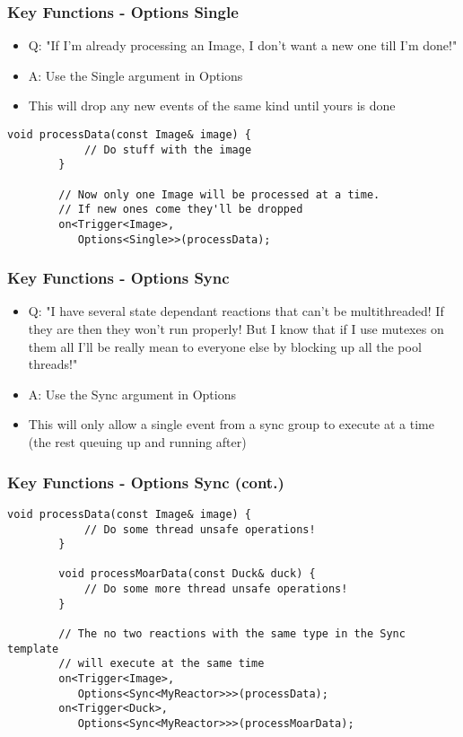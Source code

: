 \documentclass{beamer}
\begin{document}
\begin{frame}[fragile]
	\frametitle {Key Functions - Options Single}
	\begin{itemize}
		\item Q: "If I'm already processing an Image, I don't want a new one till I'm done!"
		\item A: Use the Single argument in Options
		\item This will drop any new events of the same kind until yours is done
	\end{itemize}

	\begin{lstlisting}[language=nuclear]
		void processData(const Image& image) {
		    // Do stuff with the image
		}

		// Now only one Image will be processed at a time.
		// If new ones come they'll be dropped
		on<Trigger<Image>, 
		   Options<Single>>(processData);
	\end{lstlisting}
\end{frame}

\begin{frame}[fragile]
	\frametitle {Key Functions - Options Sync}
	\begin{itemize}
		\item Q: "I have several state dependant reactions that can't be multithreaded! If they are then they won't run properly! But I know that if I use mutexes on them all I'll be really mean to everyone else by blocking up all the pool threads!"
		\item A: Use the Sync argument in Options
		\item This will only allow a single event from a sync group to execute at a time (the rest queuing up and running after)
	\end{itemize}
\end{frame}

\begin{frame}[fragile]
	\frametitle {Key Functions - Options Sync (cont.)}
	\begin{lstlisting}[language=nuclear]
		void processData(const Image& image) {
		    // Do some thread unsafe operations!
		}
		
		void processMoarData(const Duck& duck) {
		    // Do some more thread unsafe operations!
		}

		// The no two reactions with the same type in the Sync template
		// will execute at the same time
		on<Trigger<Image>, 
		   Options<Sync<MyReactor>>>(processData);
		on<Trigger<Duck>, 
		   Options<Sync<MyReactor>>>(processMoarData);
	\end{lstlisting}
\end{frame}
\end{document}
